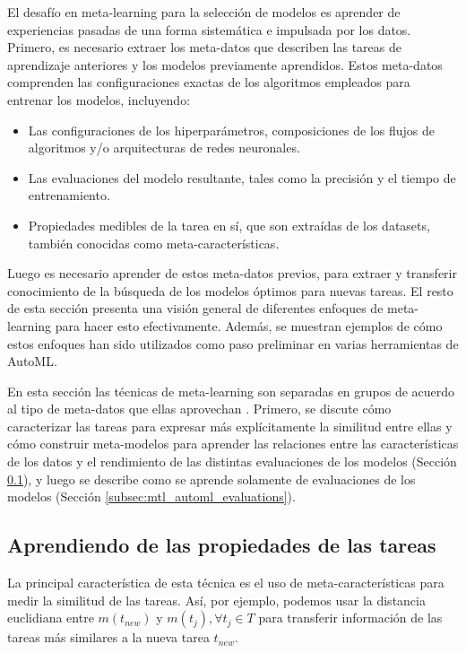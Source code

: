 \documentclass[a4paper,12pt]{article}
\begin{document}
El desafío en meta-learning para la selección de modelos es aprender de experiencias pasadas de una forma sistemática e impulsada por los datos. Primero, es necesario extraer los meta-datos que describen las tareas de aprendizaje anteriores y los modelos previamente aprendidos. Estos meta-datos comprenden las configuraciones exactas de los algoritmos empleados para entrenar los modelos, incluyendo:

\begin{itemize}
	\item Las configuraciones de los hiperparámetros, composiciones de los flujos de algoritmos y/o arquitecturas de redes neuronales.
	\item Las evaluaciones del modelo resultante, tales como la precisión y el tiempo de entrenamiento.
	\item Propiedades medibles de la tarea en sí, que son extraídas de los datasets, también conocidas como meta-características.
\end{itemize}

Luego es necesario aprender de estos meta-datos previos, para extraer y transferir conocimiento de la búsqueda de los modelos óptimos para nuevas tareas. El resto de esta sección presenta una visión general de diferentes enfoques de meta-learning para hacer esto efectivamente. Además, se muestran ejemplos de cómo estos enfoques han sido utilizados como paso preliminar en varias herramientas de AutoML.

En esta sección las técnicas de meta-learning son separadas en grupos de acuerdo al tipo de meta-datos que ellas aprovechan \cite{vanschoren2018metalearning}. Primero, se discute cómo caracterizar las tareas para expresar más explícitamente la similitud entre ellas y cómo construir meta-modelos para aprender las relaciones entre las características de los datos y el rendimiento de las distintas evaluaciones de los modelos (Sección \ref{subsec:mtl_automl_proprerties}), y luego se describe como se aprende solamente de evaluaciones de los modelos (Sección \ref{subsec:mtl_automl_evaluations}).

\subsection{Aprendiendo de las propiedades de las tareas}\label{subsec:mtl_automl_proprerties}
La principal característica de esta técnica es el uso de meta-características para medir la similitud de las tareas. Así, por ejemplo, podemos usar la distancia euclidiana entre $m(t_{new})$ y $m(t_j), \forall t_j \in T$ para transferir información de las tareas más similares a la nueva tarea $t_{new}$.
\end{document}
